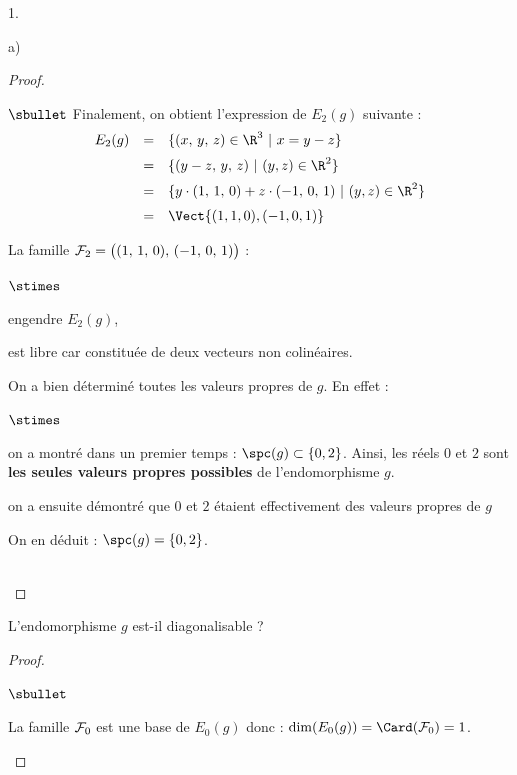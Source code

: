 \documentclass[11pt]{article}%
\begin{document}
\begin{noliste}{1.}
\begin{noliste}{a)}
\begin{proof}
\begin{noliste}{$\sbullet$}
	Finalement, on obtient l'expression de $E_2(g)$ suivante :
	\[
	  \begin{array}{rcl}
	    E_2(g) & = &  \{ (x, \, y, \, z) \in \R^3 \ | \ x=y-z \}
	    \\[.2cm]
	    & = &  \{(y-z, \, y, \, z) \ | \ (y,z) \in \R^2\}
	    \\[.2cm]
	    & = &  \{y \cdot (1, \, 1, \, 0) + z \cdot (-1, \, 0, \, 1) \ 
	    | \ (y,z) \in \R^2\}
	    \\[.2cm]
	    & = &  \Vect{(1,1,0),(-1,0,1)}
	  \end{array}
	\]
	
	La famille ${\cal F}_2 = \big( (1, \, 1, \, 0), \, (-1, \, 0,
	\, 1) \big)$ : 
	\begin{noliste}{$\stimes$}
	  \item engendre $E_2(g)$,
	  \item est libre car constituée de deux vecteurs non 
	  colinéaires.
	\end{noliste}
      \end{noliste}
      
      
      \newpage
      
      
      \begin{remark}
        On a bien déterminé toutes les valeurs propres de $g$. En
        effet :
        \begin{noliste}{$\stimes$}
        \item on a montré dans un premier temps : $\spc(g) \subset
          \{0,2\}$. Ainsi, les réels $0$ et $2$ sont {\bf les seules
            valeurs propres possibles} de l'endomorphisme $g$.
	  
	  \item on a ensuite démontré que $0$ et $2$ étaient 
	  effectivement des valeurs propres de $g$
        \end{noliste}
        On en déduit : $\spc(g) = \{0,2\}$.
      \end{remark}~\\[-1.4cm]
    \end{proof}

    
    \item L'endomorphisme $g$ est-il diagonalisable ?
    
    \begin{proof}~
      \begin{noliste}{$\sbullet$}
	\item La famille ${\cal F}_0$ est une base de $E_0(g)$ donc :
	$\dim(E_0(g)) = \Card({\cal F}_0) =1$.
	

\end{noliste}
\end{proof}
\end{noliste}
\end{noliste}
\end{document}
